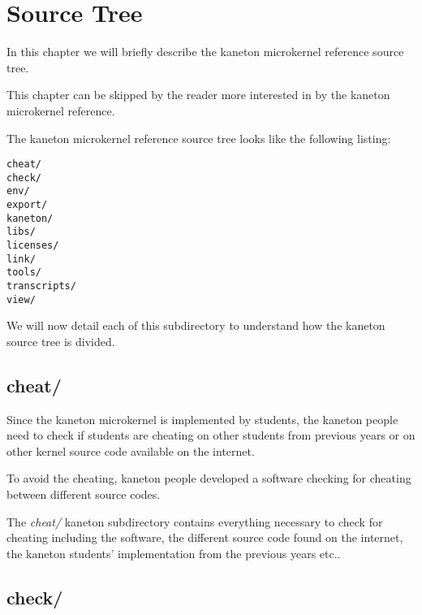 
%
%

\chapter{Source Tree}

In this chapter we will briefly describe the kaneton microkernel reference
source tree.

This chapter can be skipped by the reader more interested in by the
kaneton microkernel reference.

\newpage

%
%

The kaneton microkernel reference source tree looks like the following
listing:

\begin{verbatim}
cheat/
check/
env/
export/
kaneton/
libs/
licenses/
link/
tools/
transcripts/
view/
\end{verbatim}

We will now detail each of this subdirectory to understand how the
kaneton source tree is divided.

%
%

\section{cheat/}

Since the kaneton microkernel is implemented by students, the kaneton
people need to check if students are cheating on other students from
previous years or on other kernel source code available on the internet.

To avoid the cheating, kaneton people developed a software checking
for cheating between different source codes.

The \textit{cheat/} kaneton subdirectory contains everything necessary
to check for cheating including the software, the different source code
found on the internet, the kaneton students' implementation from the
previous years etc..

%
%

\section{check/}

